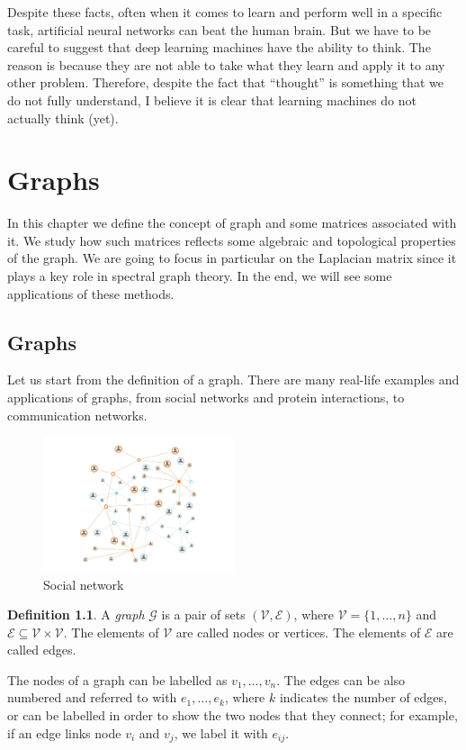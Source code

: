 \documentclass[12pt,a4paper]{report}
\theoremstyle{definition}
\newtheorem{definition}{Definition}[chapter]
\begin{document}
Despite these facts, often when it comes to learn and perform well in a specific task, artificial neural networks can beat the human brain. But we have to be careful to suggest that deep learning machines have the ability to think.
The reason is because they are not able to take what they learn and apply it to any other problem. Therefore, despite the fact that ``thought'' is something that we do not fully understand, I believe it is clear that learning machines do not actually think (yet).


\chapter{Graphs}
\label{cap:graphs}

In this chapter we define the concept of graph and some matrices associated with it. We study how such matrices reflects some algebraic and topological properties of the graph. We are going to focus in particular on the Laplacian matrix since it plays a key role in spectral graph theory. In the end, we will see some applications of these methods.

\section{Graphs}
\label{sec:graphs}

Let us start from the definition of a graph. There are many real-life examples and applications of graphs, from social networks and protein interactions, to communication networks.
\begin{figure}[ht]
    \centering
    \includegraphics[width=0.5\textwidth, trim={6cm 1.5cm 6cm 1.5cm}, clip]{Images/social_network.pdf}
    \caption{Social network}
    \label{fig:social_network}
\end{figure}
\begin{definition}
A \emph{graph} $\mathcal{G}$ is a pair of sets $(\mathcal{V}, \mathcal{E})$, where $\mathcal{V} = \{1, \ldots, n\}$ and $\mathcal{E} \subseteq \mathcal{V} \times \mathcal{V}$. The elements of $\mathcal{V}$ are called nodes or vertices. The elements of $\mathcal{E}$ are called edges.
\end{definition}
The nodes of a graph can be labelled as $v_1, \ldots, v_n$.
The edges can be also numbered and referred to with $e_1, \ldots, e_k$, where $k$ indicates the number of edges, or can be labelled in order to show the two nodes that they connect;
for example, if an edge links node $v_i$ and $v_j$, we label it with $e_{ij}$.
\end{document}
